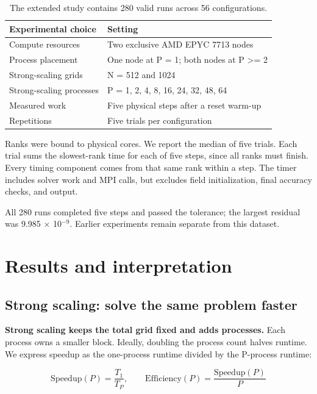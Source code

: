 \documentclass[11pt]{article}
\begin{document}
\begin{table}[H]
\centering\small
\begin{tabular}{ll}
\toprule
Experimental choice & Setting \\
\midrule
Compute resources & Two exclusive AMD EPYC 7713 nodes \\
Process placement & One node at P = 1; both nodes at P >= 2 \\
Strong-scaling grids & N = 512 and 1024 \\
Strong-scaling processes & P = 1, 2, 4, 8, 16, 24, 32, 48, 64 \\
Measured work & Five physical steps after a reset warm-up \\
Repetitions & Five trials per configuration \\
\bottomrule
\end{tabular}
\caption{The extended study contains 280 valid runs across 56 configurations.}
\end{table}

Ranks were bound to physical cores. We report the median of five trials. Each trial sums the slowest-rank time for each of five steps, since all ranks must finish. Every timing component comes from that same rank within a step. The timer includes solver work and MPI calls, but excludes field initialization, final accuracy checks, and output.

All 280 runs completed five steps and passed the tolerance; the largest residual was 9.985 $\times$ 10$^{-9}$. Earlier experiments remain separate from this dataset.

\clearpage

\section{Results and interpretation}

\subsection{Strong scaling: solve the same problem faster}

\textbf{Strong scaling keeps the total grid fixed and adds processes.} Each process owns a smaller block. Ideally, doubling the process count halves runtime. We express speedup as the one-process runtime divided by the P-process runtime:

\[
\mathrm{Speedup}(P)=\frac{T_1}{T_P},\qquad \mathrm{Efficiency}(P)=\frac{\mathrm{Speedup}(P)}{P}
\]
\end{document}
